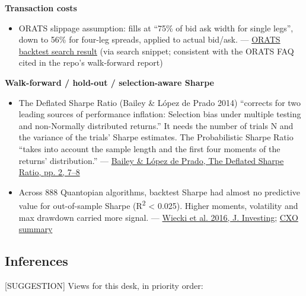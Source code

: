 \documentclass{article}
\begin{document}
\textbf{Transaction costs}

\begin{itemize}

\item ORATS slippage assumption: fills at ``75\% of bid ask width for single legs'', down to 56\% for four-leg spreads, applied to actual bid/\allowbreak{}ask. --- \href{https://orats.com/blog/avoiding-common-problems-with-backtesting}{ORATS backtest search result} (via search snippet; consistent with the ORATS FAQ cited in the repo's walk-forward report)

\end{itemize}

\textbf{Walk-forward /\allowbreak{} hold-out /\allowbreak{} selection-aware Sharpe}

\begin{itemize}

\item The Deflated Sharpe Ratio (Bailey \& López de Prado 2014) ``corrects for two leading sources of performance inflation: Selection bias under multiple testing and non-Normally distributed returns.'' It needs the number of trials N and the variance of the trials' Sharpe estimates. The Probabilistic Sharpe Ratio ``takes into account the sample length and the first four moments of the returns' distribution.'' --- \href{https://www.davidhbailey.com/dhbpapers/deflated-sharpe.pdf}{Bailey \& López de Prado, The Deflated Sharpe Ratio, pp. 2, 7--8}

\item Across 888 Quantopian algorithms, backtest Sharpe had almost no predictive value for out-of-sample Sharpe (R\textsuperscript{2} < 0.025). Higher moments, volatility and max drawdown carried more signal. --- \href{https://www.pm-research.com/content/iijinvest/25/3/69}{Wiecki et al. 2016, J. Investing}; \href{https://www.cxoadvisory.com/big-ideas/in-sample-vs-out-of-sample-performance-of-888-trading-strategies/}{CXO summary}

\end{itemize}

\subsection{Inferences}

[SUGGESTION] Views for this desk, in priority order:
\end{document}
